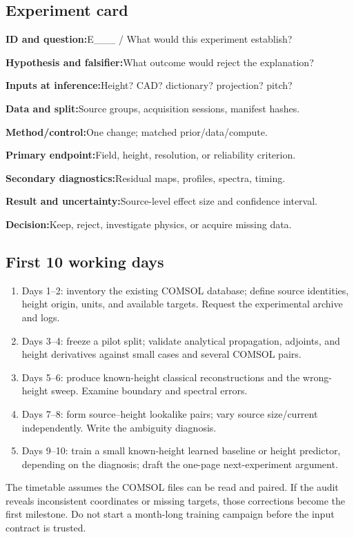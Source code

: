 \subsection{Experiment card}
\begin{tcolorbox}
\textbf{ID and question:}\quad E\_\_\_ / What would this experiment establish?\par
\textbf{Hypothesis and falsifier:}\quad What outcome would reject the explanation?\par
\textbf{Inputs at inference:}\quad Height? CAD? dictionary? projection? pitch?\par
\textbf{Data and split:}\quad Source groups, acquisition sessions, manifest hashes.\par
\textbf{Method/control:}\quad One change; matched prior/data/compute.\par
\textbf{Primary endpoint:}\quad Field, height, resolution, or reliability criterion.\par
\textbf{Secondary diagnostics:}\quad Residual maps, profiles, spectra, timing.\par
\textbf{Result and uncertainty:}\quad Source-level effect size and confidence interval.\par
\textbf{Decision:}\quad Keep, reject, investigate physics, or acquire missing data.
\end{tcolorbox}

\subsection{First 10 working days}
\begin{enumerate}
\item Days 1--2: inventory the existing COMSOL database; define source identities, height origin, units, and available targets. Request the experimental archive and logs.
\item Days 3--4: freeze a pilot split; validate analytical propagation, adjoints, and height derivatives against small cases and several COMSOL pairs.
\item Days 5--6: produce known-height classical reconstructions and the wrong-height sweep. Examine boundary and spectral errors.
\item Days 7--8: form source--height lookalike pairs; vary source size/current independently. Write the ambiguity diagnosis.
\item Days 9--10: train a small known-height learned baseline or height predictor, depending on the diagnosis; draft the one-page next-experiment argument.
\end{enumerate}
The timetable assumes the COMSOL files can be read and paired. If the audit reveals inconsistent coordinates or missing targets, those corrections become the first milestone. Do not start a month-long training campaign before the input contract is trusted.

